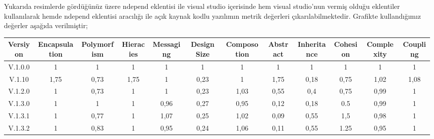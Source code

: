 \documentclass[conference]{IEEEtran}
\begin{document}
Yukarıda resimlerde gördüğünüz üzere ndepend eklentisi ile visual studio içerisinde hem visual studio'nun vermiş olduğu eklentiler kullanılarak hemde ndepend eklentisi aracılığı ile  açık kaynak kodlu yazılımın metrik değerleri çıkarılabilmektedir.
Grafikte kullandığımız değerler aşağıda verilmiştir;

\begin{table}
\begin{tabular}{|c|c|c|c|c|c|c|c|c|c|c|c|}
\hline
\textbf{Versiyon} & \textbf{Encapsulation} & \textbf{Polymorfism} & \textbf{Hieracies} & \textbf{Messaging} & \textbf{Design Size} & \textbf{Composotion} & \textbf{Abstract} & \textbf{Inheritance} & \textbf{Cohesion} & \textbf{Complexity} & \textbf{Coupling} \\ \hline
V.1.0.0           & 1                      & 1                    & 1                  & 1                  & 1                    & 1                    & 1                 & 1                    & 1                 & 1                   & 1                 \\ \hline
V.1.10            & 1,75                   & 0,73                 & 1,75               & 1                  & 0,23                 & 1                    & 1,75              & 0,18                 & 0,75              & 1,02                & 1,08              \\ \hline
V.1.2.0           & 1                      & 0,73                 & 1                  & 1                  & 0,23                 & 1,03                 & 0,55              & 0,4                  & 0,75              & 0,99                & 1                 \\ \hline
V.1.3.0           & 1                      & 1                    & 1                  & 0,96               & 0,27                 & 0,95                 & 0,12              & 0,18                 & 0.5               & 0,99                & 1                 \\ \hline
V.1.3.1           & 1                      & 0,77                 & 1                  & 1,07               & 0,25                 & 1,02                 & 0,09              & 0,55                 & 1,5               & 0,98                & 1                 \\ \hline
V.1.3.2           & 1                      & 0,83                 & 1                  & 0,95               & 0,24                 & 1,06                 & 0,11              & 0,55                 & 1.25              & 0,95                & 1                 \\ \hline

\end{tabular}
\end{table}
\end{document}
